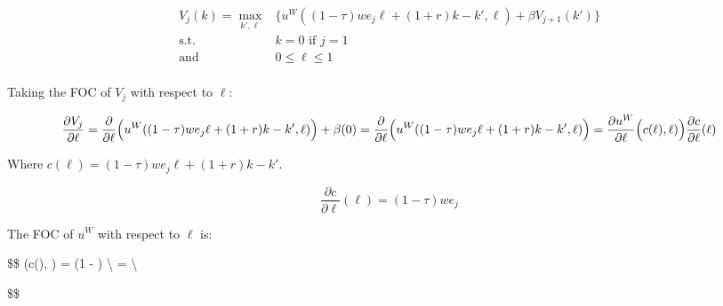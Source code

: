 \documentclass[]{article}
\begin{document}
\begin{align*}
V_j(k) = \max_{k', \ell} & \{u^{W}((1 - \tau)we_j\ell+(1+r)k-k', \ell) + \beta V_{j+1}(k')\}\\
\text{s.t. } & k = 0 \text{ if } j = 1\\
\text{and } & 0 \le \ell \le 1\\
\end{align*}

Taking the FOC of \(V_j\) with respect to \(\ell\):

\[
\frac{\partial V_j}{\partial \ell} = \frac{\partial}{\partial \ell}\Big(u^W((1 - \tau)we_j\ell+(1+r)k-k', \ell)\Big) + \beta (0)\\
 = \frac{\partial}{\partial \ell}\Big(u^W((1 - \tau)we_j\ell+(1+r)k-k', \ell)\Big) \\
 = \frac{\partial u^W}{\partial \ell}\Big(c(\ell), \ell)\Big)\frac{\partial c}{\partial \ell} (\ell)
\]

Where \(c(\ell)=(1 - \tau)we_j\ell+(1+r)k-k'\).

\[
\frac{\partial c}{\partial \ell}(\ell) = (1 - \tau)we_j
\]

The FOC of \(u^W\) with respect to \(\ell\) is:

\$\$  (c(\ell), \ell) = (1 -
\sigma)
 \textbackslash{}
=
\textbackslash{}

\$\$
\end{document}
